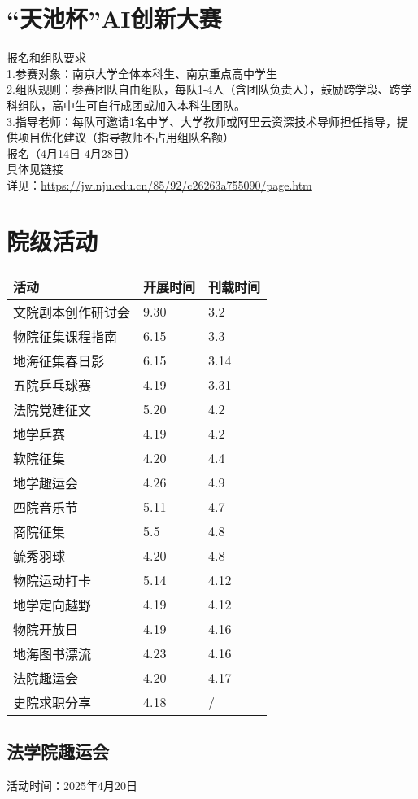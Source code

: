 \documentclass[letterpaper, 12pt]{article}
\begin{document}
\begin{multicols}{2}
\section{“天池杯”AI创新大赛}
报名和组队要求
\\1.参赛对象：南京大学全体本科生、南京重点高中学生
\\2.组队规则：参赛团队自由组队，每队1-4人（含团队负责人），鼓励跨学段、跨学科组队，高中生可自行成团或加入本科生团队。
\\3.指导老师：每队可邀请1名中学、大学教师或阿里云资深技术导师担任指导，提供项目优化建议（指导教师不占用组队名额）
\\报名（4月14日-4月28日）
\\具体见链接
\\详见：\url{https://jw.nju.edu.cn/85/92/c26263a755090/page.htm}
\section{院级活动}
\begin{tabular}{|>{\centering\arraybackslash}m{}|m{}|m{}|}
\hline
    活动 & 开展时间 & 刊载时间\\
    \hline\hline
    文院剧本创作研讨会 & 9.30 & 3.2\\
    物院征集课程指南 & 6.15 & 3.3\\
    地海征集春日影 & 6.15 & 3.14\\
    五院乒乓球赛 & 4.19 & 3.31\\
    法院党建征文 & 5.20 & 4.2\\
    地学乒赛 & 4.19 & 4.2\\
    软院征集 & 4.20 & 4.4\\
    地学趣运会 & 4.26 & 4.9\\
    四院音乐节 & 5.11 & 4.7\\
    商院征集 & 5.5 & 4.8\\
    毓秀羽球 & 4.20 & 4.8\\
    物院运动打卡 & 5.14 & 4.12\\
    地学定向越野 & 4.19 & 4.12\\
    物院开放日 & 4.19 & 4.16\\
    地海图书漂流 & 4.23 & 4.16\\
    法院趣运会 & 4.20 & 4.17\\
    史院求职分享 & 4.18 & /\\
    \hline
\end{tabular}
\subsection{法学院趣运会}
活动时间：2025年4月20日


\end{multicols}
\end{document}
